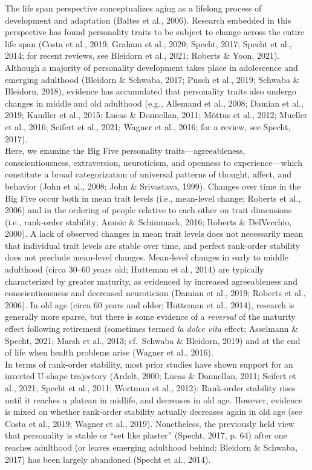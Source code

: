 \documentclass[
  english,
  man, noextraspace,floatsintext]{apa7}
\begin{document}
The life span perspective conceptualizes aging as a lifelong process of development and adaptation (Baltes et al., 2006). Research embedded in this perspective has found personality traits to be subject to change across the entire life span (Costa et al., 2019; Graham et al., 2020; Specht, 2017; Specht et al., 2014; for recent reviews, see Bleidorn et al., 2021; Roberts \& Yoon, 2021). Although a majority of personality development takes place in adolescence and emerging adulthood (Bleidorn \& Schwaba, 2017; Pusch et al., 2019; Schwaba \& Bleidorn, 2018), evidence has accumulated that personality traits also undergo changes in middle and old adulthood (e.g., Allemand et al., 2008; Damian et al., 2019; Kandler et al., 2015; Lucas \& Donnellan, 2011; Mõttus et al., 2012; Mueller et al., 2016; Seifert et al., 2021; Wagner et al., 2016; for a review, see Specht, 2017).\\
Here, we examine the Big Five personality traits---agreeableness, conscientiousness, extraversion, neuroticism, and openness to experience---which constitute a broad categorization of universal patterns of thought, affect, and behavior (John et al., 2008; John \& Srivastava, 1999). Changes over time in the Big Five occur both in mean trait levels (i.e., mean-level change; Roberts et al., 2006) and in the ordering of people relative to each other on trait dimensions (i.e., rank-order stability; Anusic \& Schimmack, 2016; Roberts \& DelVecchio, 2000). A lack of observed changes in mean trait levels does not necessarily mean that individual trait levels are stable over time, and perfect rank-order stability does not preclude mean-level changes. Mean-level changes in early to middle adulthood (circa 30--60 years old; Hutteman et al., 2014) are typically characterized by greater maturity, as evidenced by increased agreeableness and conscientiousness and decreased neuroticism (Damian et al., 2019; Roberts et al., 2006). In old age (circa 60 years and older; Hutteman et al., 2014), research is generally more sparse, but there is some evidence of a \emph{reversal} of the maturity effect following retirement (sometimes termed \emph{la dolce vita} effect; Asselmann \& Specht, 2021; Marsh et al., 2013; cf.~Schwaba \& Bleidorn, 2019) and at the end of life when health problems arise (Wagner et al., 2016).\\
In terms of rank-order stability, most prior studies have shown support for an inverted U-shape trajectory (Ardelt, 2000; Lucas \& Donnellan, 2011; Seifert et al., 2021; Specht et al., 2011; Wortman et al., 2012): Rank-order stability rises until it reaches a plateau in midlife, and decreases in old age. However, evidence is mixed on whether rank-order stability actually decreases again in old age (see Costa et al., 2019; Wagner et al., 2019). Nonetheless, the previously held view that personality is stable or \enquote{set like plaster} (Specht, 2017, p. 64) after one reaches adulthood (or leaves emerging adulthood behind; Bleidorn \& Schwaba, 2017) has been largely abandoned (Specht et al., 2014).\\
\end{document}

